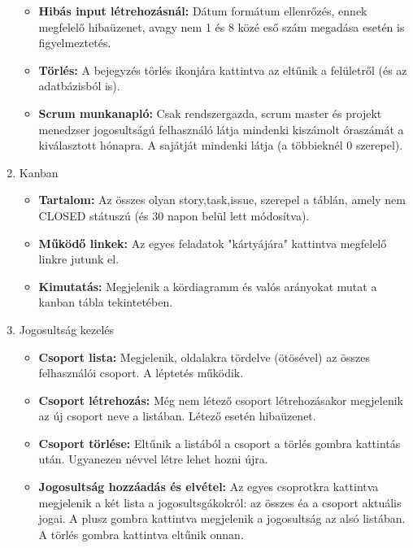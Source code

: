 \begin{enumerate}
\begin{itemize}
		\item \textbf{Hibás input létrehozásnál:} Dátum formátum ellenrőzés, ennek megfelelő hibaüzenet, avagy nem 1 és 8 közé eső szám megadása esetén is figyelmeztetés.
		\item \textbf{Törlés:} A bejegyzés törlés ikonjára kattintva az eltűnik a felületről (és az adatbázisból is).
		\item \textbf{Scrum munkanapló:} Csak rendszergazda, scrum master és projekt menedzser jogosultságú felhasználó látja mindenki kiszámolt óraszámát a kiválasztott hónapra. A sajátját mindenki látja (a többieknél 0 szerepel).
	\end{itemize}
	\item Kanban
	\begin{itemize}
		\item \textbf{Tartalom:} Az összes olyan story,task,issue, szerepel a táblán, amely nem CLOSED státuszú (és 30 napon belül lett módosítva).
		\item \textbf{Működő linkek:} Az egyes feladatok "kártyájára" kattintva megfelelő linkre jutunk el.
		\item \textbf{Kimutatás:} Megjelenik a kördiagramm és valós arányokat mutat a kanban tábla tekintetében.
	\end{itemize}
	\item Jogosultság kezelés
	\begin{itemize}
		\item \textbf{Csoport lista:} Megjelenik, oldalakra tördelve (ötösével) az összes felhasználói csoport. A léptetés működik.
		\item \textbf{Csoport létrehozás:} Még nem létező csoport létrehozásakor megjelenik az új csoport neve a listában. Létező esetén hibaüzenet.
		\item \textbf{Csoport törlése:} Eltűnik a listából a csoport a törlés gombra kattintás után. Ugyanezen névvel létre lehet hozni újra.
		\item \textbf{Jogosultság hozzáadás és elvétel:} Az egyes csoprotkra kattintva megjelenik a két lista a jogosultsgákokról: az összes éa a csoport aktuális jogai. A plusz gombra kattintva megjelenik a jogosultság az alsó listában. A törlés gombra kattintva eltűnik onnan.
	\end{itemize}
\end{enumerate}